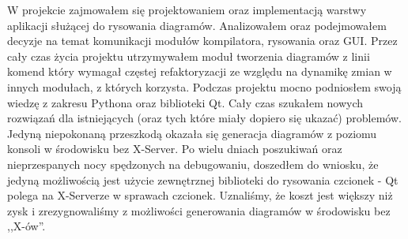 W projekcie zajmowałem się projektowaniem oraz implementacją warstwy aplikacji służącej do rysowania diagramów. Analizowałem oraz podejmowałem decyzje na temat komunikacji modułów kompilatora, rysowania oraz GUI. Przez cały czas życia projektu utrzymywałem moduł tworzenia diagramów z linii komend który wymagał częstej refaktoryzacji ze względu na dynamikę zmian w innych modułach, z których korzysta.
Podczas projektu mocno podniosłem swoją wiedzę z zakresu Pythona oraz biblioteki Qt. Cały czas szukałem nowych rozwiązań dla istniejących (oraz tych które miały dopiero się ukazać) problemów. Jedyną niepokonaną przeszkodą okazała się generacja diagramów z poziomu konsoli w środowisku bez X-Server. Po wielu dniach poszukiwań oraz nieprzespanych nocy spędzonych na debugowaniu, doszedłem do wniosku, że jedyną możliwością jest użycie zewnętrznej biblioteki do rysowania czcionek - Qt polega na X-Serverze w sprawach czcionek. Uznaliśmy, że koszt jest większy niż zysk i zrezygnowaliśmy z możliwości generowania diagramów w środowisku bez ,,X-ów''.